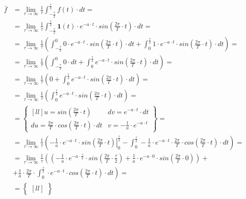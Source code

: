 \begin{task}
\begin{align*}
\bar{f} &=\lim_{\tau \rightarrow \infty }\frac{1}{\tau}\int_{-\frac{\tau}{2}}^{\frac{\tau}{2}}f(t) \cdot dt=\\
 &=\lim_{\tau \rightarrow \infty }\frac{1}{\tau}\int_{-\frac{\tau}{2}}^{\frac{\tau}{2}} \mathbf{1}(t)\cdot e^{-a\cdot t}\cdot sin\left(\frac{2\pi}{T}\cdot t \right) \cdot dt=\\
 &=\lim_{\tau \rightarrow \infty }\frac{1}{\tau}\left(
 \int_{-\frac{\tau}{2}}^{0} 0 \cdot e^{-a\cdot t}\cdot sin\left(\frac{2\pi}{T}\cdot t \right) \cdot dt +
 \int_{0}^{\frac{\tau}{2}} 1 \cdot e^{-a\cdot t}\cdot sin\left(\frac{2\pi}{T}\cdot t \right) \cdot dt \right)=\\
 &=\lim_{\tau \rightarrow \infty }\frac{1}{\tau}\left(
 \int_{-\frac{\tau}{2}}^{0} 0 \cdot dt +
 \int_{0}^{\frac{\tau}{2}} e^{-a\cdot t}\cdot sin\left(\frac{2\pi}{T}\cdot t \right) \cdot dt \right)=\\
 &=\lim_{\tau \rightarrow \infty }\frac{1}{\tau}\left(
 0 +
 \int_{0}^{\frac{\tau}{2}} e^{-a\cdot t}\cdot sin\left(\frac{2\pi}{T}\cdot t \right) \cdot dt \right)=\\
 &=\lim_{\tau \rightarrow \infty }\frac{1}{\tau}\left(
 \int_{0}^{\frac{\tau}{2}} e^{-a\cdot t}\cdot sin\left(\frac{2\pi}{T}\cdot t \right) \cdot dt \right)=\\
 &=\begin{Bmatrix*}[ll]
 u=sin(\frac{2\pi}{T}\cdot t) & dv = e^{-a \cdot t}\cdot dt\\ 
 du=\frac{2\pi}{T} \cdot cos(\frac{2\pi}{T}\cdot t)\cdot dt & v=-\frac{1}{a}\cdot e^{-a\cdot t}
 \end{Bmatrix*}=\\
 &=\lim_{\tau \rightarrow \infty }\frac{1}{\tau}\left(
 \left. -\frac{1}{a}\cdot e^{-a\cdot t} \cdot sin \left(\frac{2\pi}{T}\cdot t\right) \right|_{0}^{\frac{\tau}{2}}
 -\int_{0}^{\frac{\tau}{2}} -\frac{1}{a}\cdot e^{-a\cdot t} \cdot \frac{2\pi}{T} \cdot cos\left(\frac{2\pi}{T}\cdot t\right)\cdot dt
 \right)=\\
 &=\lim_{\tau \rightarrow \infty }\frac{1}{\tau}\left(
 \left( -\frac{1}{a}\cdot e^{-a\cdot \frac{\tau}{2}} \cdot sin \left(\frac{2\pi}{T}\cdot \frac{\tau}{2}\right) + \frac{1}{a}\cdot e^{-a\cdot 0} \cdot sin \left(\frac{2\pi}{T}\cdot 0\right) \right)\right.+\\
 &\left.+\frac{1}{a} \cdot \frac{2\pi}{T} \cdot \int_{0}^{\frac{\tau}{2}} \cdot e^{-a\cdot t} \cdot cos\left(\frac{2\pi}{T}\cdot t\right)\cdot dt \right)=\\
 &=\begin{Bmatrix*}[ll]

\end{Bmatrix*}
\end{align*}
\end{task}
